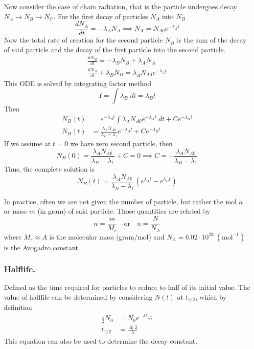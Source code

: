 \documentclass[../../../main.tex]{subfiles}
\begin{document}
Now consider the case of chain radiation, that is the particle undergoes decay $N_A\rightarrow N_B\rightarrow N_C$. For the first decay of particles $N_A$ into $N_B$
\begin{equation*}
    \frac{dN_A}{dt}=-\lambda_A N_A\implies N_A=N_{A0}e^{-\lambda_A t}
\end{equation*}
Now the total rate of creation for the second particle $N_B$ is the sum of the decay of said particle and the decay of the first particle into the second particle.
\begin{align*}
    \frac{dN_B}{dt}=-\lambda_BN_B+\lambda_AN_A\\
    \frac{dN_B}{dt}+\lambda_BN_B=\lambda_AN_{A0}e^{-\lambda_A t}
\end{align*}
This ODE is solved by integrating factor method
\begin{equation*}
    I=\int \lambda_B\;dt=\lambda_B t
\end{equation*}
Then 
\begin{align*}
    N_B(t)&=e^{-\lambda_B t}\int\lambda_AN_{A0}e^{-\lambda_A t}\;dt +Ce^{-\lambda_B t}\\
    N_B(t)&=\frac{\lambda_AN_{A0}}{\lambda_B-\lambda_1}e^{-\lambda_A t}+Ce^{-\lambda_B t}
\end{align*}
If we assume at $t=0$ we have zero second particle, then 
\begin{equation*}
    N_B(0)=\frac{\lambda_AN_{A0}}{\lambda_B-\lambda_1}+C=0\implies C=-\frac{\lambda_AN_{A0}}{\lambda_B-\lambda_1}
\end{equation*}
Thus, the complete solution is 
\begin{equation*}
    N_B(t)=\frac{\lambda_AN_{A0}}{\lambda_B-\lambda_1}\left(e^{\lambda_A t}-e^{\lambda_Bt}\right)
\end{equation*}

In practice, often we are not given the number of particle, but rather the mol $n$ or mass $m$ (in gram) of said particle. Those quantities are related by 
\begin{equation*}
    n=\frac{m}{M_r}\quad \text{or}\quad n=\frac{N}{N_A}
\end{equation*}
where $M_r\approx A$ is the molecular mass (gram/mol) and $N_A=6.02\cdot 10^{23}\;(\text{mol}^{-1})$ is the Avogadro constant.

\subsubsection*{Halflife.} Defined as the time required for particles to reduce to half of its initial value. The value of halflife can be determined by considering $N(t)$ at $t_{1/2}$, which by definition
\begin{align*}
    \frac{1}{2}N_0&=N_0e^{-\lambda t_{1/2}}\\
    t_{1/2}&=\frac{\ln 2}{\lambda}
\end{align*}
This equation can also be used to determine the decay constant.
\end{document}

